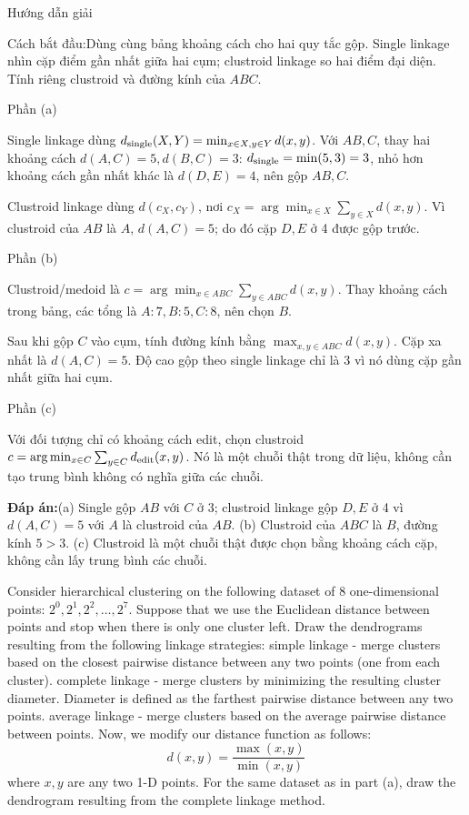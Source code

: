 \documentclass[10pt,a4paper,twocolumn]{article}
\makeatletter
\newcommand{\maptag}[1]{\phantomsection\@bsphack\protected@write\@auxout{}{\string\newlabel{#1}{{}{\thepage}{}{\@currentHref}{}}}\@esphack}
\newcommand{\key}[1]{#1:\enspace}
\newcommand{\solutionprompt}[1]{\par\addvspace{1pt}\noindent\key{Cách bắt đầu}#1\par\addvspace{2pt}}
\newcommand{\blocklabel}[1]{\par\noindent#1\par\nobreak}
\newcommand{\answer}[1]{%
  \par\addvspace{3pt}%
  \blocklabel{#1Hướng dẫn giải}}
\newcommand{\finalanswer}[1]{%
  \par\addvspace{3pt}\noindent\textbf{Đáp án:}\nobreak\enspace#1\par}
\newcommand{\guidepart}[1]{%
  \par\addvspace{1.5pt}%
  \blocklabel{Phần #1}}
\makeatother
\begin{document}
\answer{\maptag{answer:Pr7}}
\solutionprompt{Dùng cùng bảng khoảng cách cho hai quy tắc gộp. Single linkage nhìn cặp điểm gần nhất giữa hai cụm; clustroid linkage so hai điểm đại diện. Tính riêng clustroid và đường kính của $ABC$.}
\guidepart{(a)}
\begin{guidesteps}
\item Single linkage dùng $d_{\rm single}(X,Y)=\min_{x\in X,y\in Y}d(x,y)$. Với $AB,C$, thay hai khoảng cách $d(A,C)=5,d(B,C)=3$: $d_{\rm single}=\min(5,3)=3$, nhỏ hơn khoảng cách gần nhất khác là $d(D,E)=4$, nên gộp $AB,C$.
\item Clustroid linkage dùng $d(c_X,c_Y)$, nơi $c_X=\arg\min_{x\in X}\sum_{y\in X}d(x,y)$. Vì clustroid của $AB$ là $A$, $d(A,C)=5$; do đó cặp $D,E$ ở 4 được gộp trước.
\end{guidesteps}
\guidepart{(b)}
\begin{guidesteps}
\item Clustroid/medoid là $c=\arg\min_{x\in ABC}\sum_{y\in ABC}d(x,y)$. Thay khoảng cách trong bảng, các tổng là $A:7,B:5,C:8$, nên chọn $B$.
\item Sau khi gộp $C$ vào cụm, tính đường kính bằng $\max_{x,y\in ABC}d(x,y)$. Cặp xa nhất là $d(A,C)=5$. Độ cao gộp theo single linkage chỉ là 3 vì nó dùng cặp gần nhất giữa hai cụm.
\end{guidesteps}
\guidepart{(c)}
\begin{guidesteps}
\item Với đối tượng chỉ có khoảng cách edit, chọn clustroid $c=\arg\min_{x\in C}\sum_{y\in C}d_{\rm edit}(x,y)$. Nó là một chuỗi thật trong dữ liệu, không cần tạo trung bình không có nghĩa giữa các chuỗi.
\end{guidesteps}
\finalanswer{(a) Single gộp $AB$ với $C$ ở 3; clustroid linkage gộp $D,E$ ở 4 vì $d(A,C)=5$ với $A$ là clustroid của $AB$. (b) Clustroid của $ABC$ là $B$, đường kính $5>3$. (c) Clustroid là một chuỗi thật được chọn bằng khoảng cách cặp, không cần lấy trung bình các chuỗi.}

 Consider hierarchical clustering on the following dataset of 8 one-dimensional points: $2^0,2^1,2^2,\ldots,2^7$. Suppose that we use the Euclidean distance between points and stop when there is only one cluster left. Draw the dendrograms resulting from the following linkage strategies:
 simple linkage - merge clusters based on the closest pairwise distance between any two points (one from each cluster).
 complete linkage - merge clusters by minimizing the resulting cluster diameter. Diameter is defined as the farthest pairwise distance between any two points.
 average linkage - merge clusters based on the average pairwise distance between points.
 Now, we modify our distance function as follows:
\[
d(x,y)=\frac{\max(x,y)}{\min(x,y)}
\]
where $x,y$ are any two 1-D points. For the same dataset as in part (a), draw the dendrogram resulting from the complete linkage method.
\end{document}
